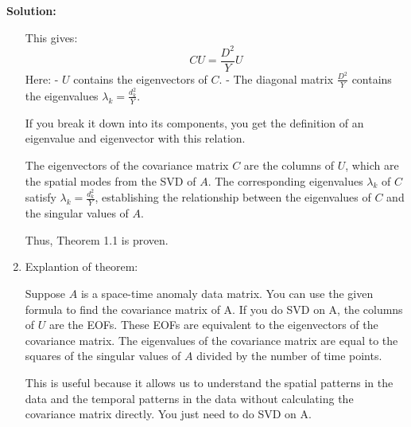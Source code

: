 \documentclass[12pt]{article}
\newenvironment{solution}{
    \textbf{Solution:}
    
}{
    
    \vspace{2em}
}
\begin{document}
\begin{solution}
\begin{enumerate}[label=\alph*)]
    This gives:
    \[
        CU = \frac{D^2}{Y} U
    \]
    Here:
    - \( U \) contains the eigenvectors of \( C \).
    - The diagonal matrix \( \frac{D^2}{Y} \) contains the eigenvalues \( \lambda_k = \frac{d_k^2}{Y} \).

    If you break it down into its components, you get the definition of an eigenvalue and eigenvector with this relation.
    
    The eigenvectors of the covariance matrix \( C \) are the columns of \( U \), which are the spatial modes from the SVD of \( A \). The corresponding eigenvalues \( \lambda_k \) of \( C \) satisfy \( \lambda_k = \frac{d_k^2}{Y} \), establishing the relationship between the eigenvalues of \( C \) and the singular values of \( A \).
    
    Thus, Theorem 1.1 is proven.

    \item Explantion of theorem:
    
    Suppose \(A\) is a space-time anomaly data matrix. You can use the given formula to find the covariance matrix of A. If you do SVD on A, the columns of \(U\) are the EOFs. These EOFs are equivalent to the eigenvectors of the covariance matrix. The eigenvalues of the covariance matrix are equal to the squares of the singular values of \(A\) divided by the number of time points.

    This is useful because it allows us to understand the spatial patterns in the data and the temporal patterns in the data without calculating the covariance matrix directly. You just need to do SVD on A.
    \end{enumerate}
\end{solution}

\newpage
\end{document}
